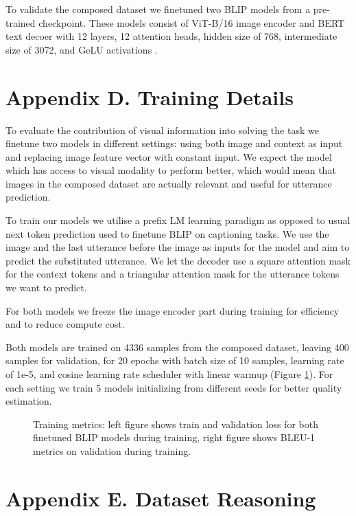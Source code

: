 \documentclass[11pt]{article}
\begin{document}
To validate the composed dataset we finetuned two BLIP models from a pre-trained checkpoint. These models consist of ViT-B/16 image encoder and BERT text decoer with 12 layers, 12 attention heads, hidden size of 768, intermediate size of 3072, and GeLU activations \cite{gelu}.

\section*{Appendix D. Training Details}


To evaluate the contribution of visual information into solving the task we finetune two models in different settings: using both image and context as input and replacing image feature vector with constant input. We expect the model which has access to visual modality to perform better, which would mean that images in the composed dataset are actually relevant and useful for utterance prediction.

To train our models we utilise a prefix LM learning paradigm as opposed to usual next token prediction used to finetune BLIP on captioning tasks. We use the image and the last utterance before the image as inputs for the model and aim to predict the substituted utterance. We let the decoder use a square attention mask for the context tokens and a triangular attention mask for the utterance tokens we want to predict.

For both models we freeze the image encoder part during training for efficiency and to reduce compute cost.

Both models are trained on 4336 samples from the composed dataset, leaving 400 samples for validation, for 20 epochs with batch size of 10 samples, learning rate of 1e-5, and cosine learning rate scheduler with linear warmup (Figure \ref{fig:bleu_val}). For each setting we train 5 models initializing from different seeds for better quality estimation.

\begin{figure}
    \centering
    \caption{Training metrics: left figure shows train and validation loss for both finetuned BLIP models during training, right figure shows BLEU-1 metrics on validation during training.}
    \label{fig:bleu_val}
\end{figure}

\section*{Appendix E. Dataset Reasoning}
\end{document}
